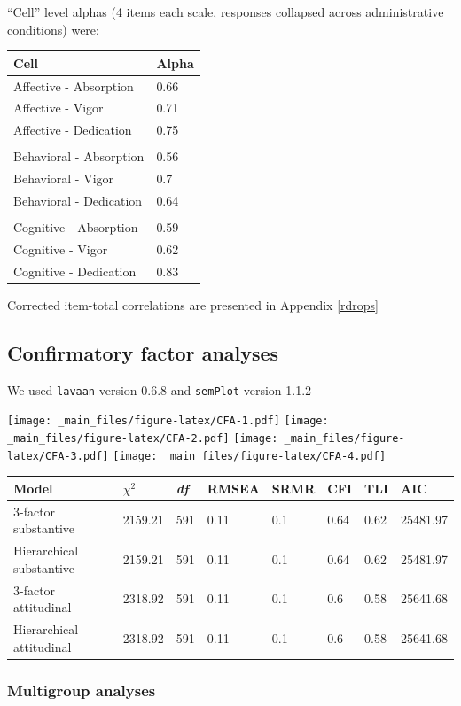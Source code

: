 \documentclass[
]{book}
\begin{document}
``Cell'' level alphas (4 items each scale, responses collapsed across administrative conditions) were:

\begin{longtable}[]{@{}ll@{}}
\toprule
Cell & Alpha\tabularnewline
\midrule
\endhead
Affective - Absorption & 0.66\tabularnewline
Affective - Vigor & 0.71\tabularnewline
Affective - Dedication & 0.75\tabularnewline
&\tabularnewline
Behavioral - Absorption & 0.56\tabularnewline
Behavioral - Vigor & 0.7\tabularnewline
Behavioral - Dedication & 0.64\tabularnewline
&\tabularnewline
Cognitive - Absorption & 0.59\tabularnewline
Cognitive - Vigor & 0.62\tabularnewline
Cognitive - Dedication & 0.83\tabularnewline
\bottomrule
\end{longtable}

Corrected item-total correlations are presented in Appendix \ref{rdrops}

\hypertarget{confirmatory-factor-analyses}{%
\subsection{Confirmatory factor analyses}\label{confirmatory-factor-analyses}}

We used \texttt{lavaan} version 0.6.8 \citep{R-lavaan} and \texttt{semPlot} version 1.1.2 \citep{R-semPlot}

\texttt{[image: \_main\_files/figure-latex/CFA-1.pdf]} \texttt{[image: \_main\_files/figure-latex/CFA-2.pdf]} \texttt{[image: \_main\_files/figure-latex/CFA-3.pdf]} \texttt{[image: \_main\_files/figure-latex/CFA-4.pdf]}

\begin{longtable}[]{@{}llllllll@{}}
\toprule
Model & \(\chi^2\) & \emph{df} & RMSEA & SRMR & CFI & TLI & AIC\tabularnewline
\midrule
\endhead
3-factor substantive & 2159.21 & 591 & 0.11 & 0.1 & 0.64 & 0.62 & 25481.97\tabularnewline
Hierarchical substantive & 2159.21 & 591 & 0.11 & 0.1 & 0.64 & 0.62 & 25481.97\tabularnewline
3-factor attitudinal & 2318.92 & 591 & 0.11 & 0.1 & 0.6 & 0.58 & 25641.68\tabularnewline
Hierarchical attitudinal & 2318.92 & 591 & 0.11 & 0.1 & 0.6 & 0.58 & 25641.68\tabularnewline
\bottomrule
\end{longtable}

\hypertarget{multigroup-analyses}{%
\subsubsection{Multigroup analyses}\label{multigroup-analyses}}
\end{document}
